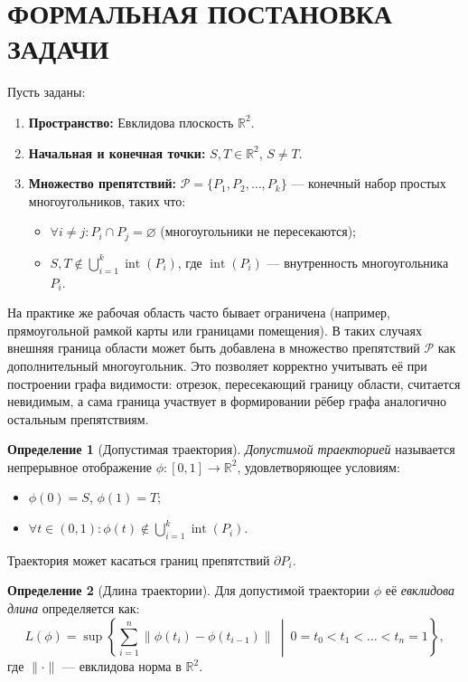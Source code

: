 \documentclass[intlimits,twoside,a4paper,11pt]{article}
\theoremstyle{definition}
\newtheorem{definition}{Определение}[section]
\begin{document}
\section{ФОРМАЛЬНАЯ ПОСТАНОВКА ЗАДАЧИ}
\label{sec:problem}

Пусть заданы:
\begin{enumerate}
    \item[\textbf{1.}] \textbf{Пространство:} Евклидова плоскость $\mathbb{R}^2$.
    \item[\textbf{2.}] \textbf{Начальная и конечная точки:} $S, T \in \mathbb{R}^2$, $S \neq T$.
    \item[\textbf{3.}] \textbf{Множество препятствий:} $\mathcal{P} = \{P_1, P_2, \dots, P_k\}$ --- конечный набор простых многоугольников, таких что:
    \begin{itemize}
        \item $\forall i \neq j: P_i \cap P_j = \varnothing$ (многоугольники не пересекаются);
        \item $S, T \notin \bigcup_{i=1}^k \operatorname{int}(P_i)$, где $\operatorname{int}(P_i)$ --- внутренность многоугольника $P_i$.
    \end{itemize}
\end{enumerate}

На практике же рабочая область часто бывает ограничена (например, прямоугольной рамкой карты или границами помещения). 
В таких случаях внешняя граница области может быть добавлена в множество препятствий $\mathcal{P}$ как дополнительный многоугольник. 
Это позволяет корректно учитывать её при построении графа видимости: отрезок, пересекающий границу области, считается невидимым, 
а сама граница участвует в формировании рёбер графа аналогично остальным препятствиям.

\begin{definition}[Допустимая траектория]
\textit{Допустимой траекторией} называется непрерывное отображение $\phi: [0, 1] \to \mathbb{R}^2$, удовлетворяющее условиям:
\begin{itemize}
    \item $\phi(0) = S$, $\phi(1) = T$;
    \item $\forall t \in (0, 1): \phi(t) \notin \bigcup_{i=1}^k \operatorname{int}(P_i)$.
\end{itemize}
Траектория может касаться границ препятствий $\partial P_i$.
\end{definition}

\begin{definition}[Длина траектории]
Для допустимой траектории $\phi$ её \textit{евклидова длина} определяется как:
\[
L(\phi) = \sup \left\{ \sum_{i=1}^{n} \|\phi(t_i) - \phi(t_{i-1})\| \ \middle| \ 0 = t_0 < t_1 < \dots < t_n = 1 \right\},
\]
где $\| \cdot \|$ --- евклидова норма в $\mathbb{R}^2$.
\end{definition}
\end{document}
